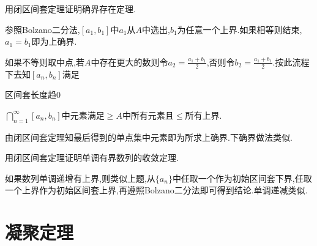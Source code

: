 \documentclass[cn,chinese,fontset]{elegantbook}
\begin{document}
            \begin{exercise}
                用闭区间套定理证明确界存在定理.
            \end{exercise}
            \begin{solution}
                参照Bolzano二分法,$[a_1,b_1]$中$a_1$从$A$中选出,$b_1$为任意一个上界.如果相等则结束,$a_1=b_1$即为上确界.

                如果不等则取中点,若$A$中存在更大的数则令$a_2=\frac{a_1+b_1}{2}$,否则令$b_2=\frac{a_1+b_1}{2}$.按此流程下去知$[a_n,b_n]$满足
                
                区间套长度趋0
                
                $\textstyle\bigcap_{n=1}^\infty[a_n,b_n]$中元素满足$\geqslant A$中所有元素且$\leqslant $所有上界.
                
                由闭区间套定理知最后得到的单点集中元素即为所求上确界.下确界做法类似.
            \end{solution}
            
            \begin{exercise}
                用闭区间套定理证明单调有界数列的收敛定理.
            \end{exercise}
            \begin{solution}
                如果数列单调递增有上界,则类似上题,从$\{a_n\}$中任取一个作为初始区间套下界,任取一个上界作为初始区间套上界,再遵照Bolzano二分法即可得到结论.单调递减类似.
            \end{solution}
        \section{凝聚定理}
\end{document}
